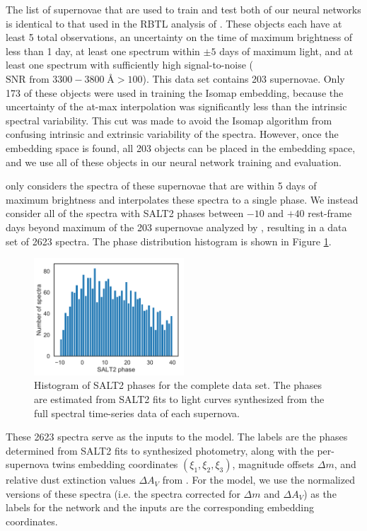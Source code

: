 The list of supernovae that are used to train and test both of our neural networks is identical to that used in the RBTL analysis of . These objects each have at least 5 total observations, an uncertainty on the time of maximum brightness of less than 1 day, at least one spectrum within $\pm 5$ days of maximum light, and at least one spectrum with sufficiently high signal-to-noise ($\text{SNR from }3300-3800\;\text{\AA} > 100$). This data set contains 203 supernovae. Only 173 of these objects were used in training the Isomap embedding, because the uncertainty of the at-max interpolation was significantly less than the intrinsic spectral variability. This cut was made to avoid the Isomap algorithm from confusing intrinsic and extrinsic variability of the spectra. However, once the embedding space is found, all 203 objects can be placed in the embedding space, and we use all of these objects in our neural network training and evaluation.

 only considers the spectra of these supernovae that are within 5 days of maximum brightness and interpolates these spectra to a single phase. We instead consider all of the spectra with SALT2 phases between $-10$ and $+40$ rest-frame days beyond maximum of the 203 supernovae analyzed by \cite{boone_twins_2020a}, resulting in a data set of 2623 spectra. The phase distribution histogram is shown in Figure \ref{fig:phase_distribution}.

\begin{figure}[ht]
    \centering
    \includegraphics[width=0.5\textwidth]{figures/nn_twins/phase_histogram.pdf}
    \caption{Histogram of SALT2 phases for the complete data set. The phases are estimated from SALT2 fits to light curves synthesized from the full spectral time-series data of each supernova.}
    \label{fig:phase_distribution}
\end{figure}

These 2623 spectra serve as the inputs to the \stoe{} model. The labels are the phases determined from SALT2 fits to synthesized photometry, along with the per-supernova twins embedding coordinates $(\xi_1, \xi_2, \xi_3)$, magnitude offsets $\Delta m$, and relative dust extinction values $\Delta A_V$ from . For the \etos{} model, we use the normalized versions of these spectra (i.e. the spectra corrected for $\Delta m$ and $\Delta A_V$) as the labels for the network and the inputs are the corresponding embedding coordinates.

